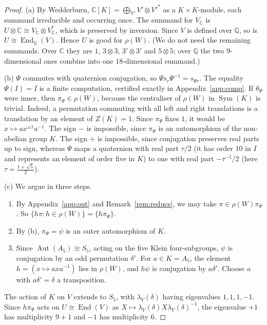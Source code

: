 \documentclass[11pt]{article}
\theoremstyle{definition}
\newcommand{\Q}{\mathbb{Q}}
\newcommand{\C}{\mathbb{C}}
\newcommand{\Aut}{\operatorname{Aut}}
\newcommand{\End}{\operatorname{End}}
\newcommand{\Sym}{\operatorname{Sym}}
\begin{document}
\begin{proof}
(a) By Wedderburn, $\C[K]=\bigoplus_{V'}V'\otimes V'^*$ as a $K\times K$-module, each summand irreducible and
occurring once. The summand for $V_\C$ is $U\otimes\C\cong V_\C\otimes V_\C^*$, which is preserved by inversion. Since
$V$ is defined over $\Q$, so is $U\cong\End_\Q(V)$. Hence $U$ is good for $\rho(W)$. (We do not need the remaining
summands. Over $\C$ they are $1$, $3\otimes3$, $3'\otimes3'$ and $5\otimes5$; over $\Q$ the two $9$-dimensional
ones combine into one $18$-dimensional summand.)

(b) $\Psi$ commutes with quaternion conjugation, so $\Psi s_r\Psi^{-1}=s_{\Psi r}$. The equality $\Psi(I)=I$ is a
finite computation, certified exactly in Appendix~\ref{app:comp}. If $\theta_\Psi$ were inner, then
$\pi_\Psi\in\rho(W)$, because the centraliser of $\rho(W)$ in $\Sym(K)$ is trivial. Indeed, a permutation commuting
with all left and right translations is a translation by an element of $Z(K)=1$. Since $\pi_\Psi$ fixes $1$, it would be $x\mapsto ax^{\pm1}a^{-1}$. The sign $-$ is impossible, since $\pi_\Psi$ is an
automorphism of the non-abelian group $K$. The sign $+$ is impossible, since conjugation preserves real parts up to
sign, whereas $\Psi$ maps a quaternion with real part $\tau/2$ (it has order $10$ in $I$ and represents an element of
order five in $K$) to one with real part $-\tau^{-1}/2$ (here $\tau=\frac{1+\sqrt5}2$).

(c) We argue in three steps.
\begin{enumerate}[label=(\roman*)]
\item By Appendix~\ref{app:out} and Remark~\ref{rem:reduce}, we may take $\pi\in\rho(W)\pi_\Psi$. So $\{h\pi:h\in\rho(W)\}=\{h\pi_\Psi\}$.
\item By (b), $\pi_\Psi=\psi$ is an outer automorphism of $K$.
\item Since $\Aut(A_5)\cong S_5$, acting on the five Klein four-subgroups, $\psi$ is conjugation by an odd
permutation $\delta'$. For $a\in K=A_5$, the element $h=(x\mapsto axa^{-1})$ lies in $\rho(W)$, and $h\psi$ is
conjugation by $a\delta'$. Choose $a$ with $a\delta'=\delta$ a transposition.
\end{enumerate}
The action of $K$ on $V$ extends to $S_5$, with $\lambda_V(\delta)$ having eigenvalues $1,1,1,-1$. Since
$h\pi_\Psi$ acts on $U\cong\End(V)$ as $X\mapsto\lambda_V(\delta)X\lambda_V(\delta)^{-1}$, the eigenvalue $+1$ has
multiplicity $9+1$ and $-1$ has multiplicity $6$.
\end{proof}
\end{document}
